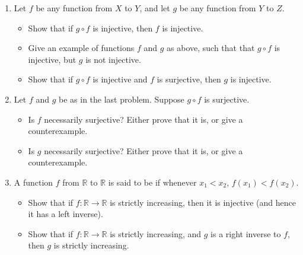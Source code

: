 \documentclass[letterpaper,10pt,english]{sphinxmanual}
\begin{document}
\label{\detokenize{functions:exercises}}\begin{enumerate}
%
\item {} 
\sphinxAtStartPar
Let \(f\) be any function from \(X\) to \(Y\), and let \(g\) be any function from \(Y\) to \(Z\).
\begin{itemize}
\item {} 
\sphinxAtStartPar
Show that if \(g \circ f\) is injective, then \(f\) is injective.

\item {} 
\sphinxAtStartPar
Give an example of functions \(f\) and \(g\) as above, such that that \(g \circ f\) is injective, but \(g\) is not injective.

\item {} 
\sphinxAtStartPar
Show that if \(g \circ f\) is injective and \(f\) is surjective, then \(g\) is injective.

\end{itemize}

\item {} 
\sphinxAtStartPar
Let \(f\) and \(g\) be as in the last problem. Suppose \(g \circ f\) is surjective.
\begin{itemize}
\item {} 
\sphinxAtStartPar
Is \(f\) necessarily surjective? Either prove that it is, or give a counterexample.

\item {} 
\sphinxAtStartPar
Is \(g\) necessarily surjective? Either prove that it is, or give a counterexample.

\end{itemize}

\item {} 
\sphinxAtStartPar
A function \(f\) from \(\mathbb{R}\) to \(\mathbb{R}\) is said to be
 if whenever \(x_1 < x_2\), \(f(x_1) < f(x_2)\).
\begin{itemize}
\item {} 
\sphinxAtStartPar
Show that if \(f : \mathbb{R} \to \mathbb{R}\) is strictly increasing, then it is injective (and hence it has a left inverse).

\item {} 
\sphinxAtStartPar
Show that if \(f : \mathbb{R} \to \mathbb{R}\) is strictly increasing, and \(g\) is a right inverse to \(f\), then \(g\) is
strictly increasing.

\end{itemize}


\end{enumerate}
\end{document}
